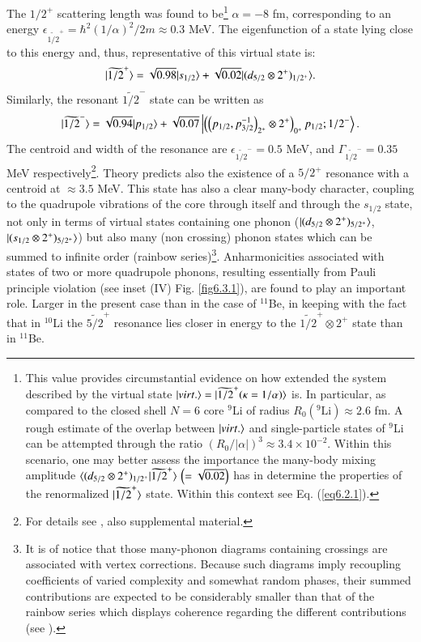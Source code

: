 The $1/2^+$ scattering length was found to be\footnote{This value provides circumstantial evidence on how extended the system described by the virtual state $|{virt.} \rangle=|{\widetilde{1/2}^+ (\kappa=1/\alpha)} \rangle$ is. In particular, as compared to the closed shell $N=6$ core $^9$Li of radius $R_0(^9\text{Li})\approx2.6$ fm. A rough estimate of the overlap between $|{virt.} \rangle$ and single-particle states of $^9$Li can be attempted through the ratio $(R_0/|\alpha|)^3\approx3.4\times10^{-2}$. Within this scenario, one may better assess the importance  the many-body mixing amplitude $\langle {(d_{5/2}\otimes 2^+)_{1/2^+}|\widetilde{1/2}^+} \rangle\,\left(=\sqrt{0.02}\right)$ has in determine the properties of the renormalized $|{\widetilde{1/2}^+} \rangle$ state. Within this context see Eq. (\ref{eq6.2.1}).} $\alpha=-8$ fm, corresponding to an energy $\epsilon_{\widetilde{1/2}^+}=\hbar^2(1/\alpha)^2/2m\approx0.3$ MeV. The eigenfunction of a state lying close to this energy and, thus, representative of this virtual state is:
\begin{equation}\label{eq5.2.1}
|{\widetilde{1/2}^+} \rangle=\sqrt{0.98}|{s_{1/2}} \rangle+\sqrt{0.02}|{(d_{5/2}\otimes2^+)_{1/2^+}} \rangle. 
\end{equation}
Similarly, the resonant $\widetilde{1/2}^-$  state can be  written as
\begin{equation}\label{eq5.2.2}
|{\widetilde{1/2}^-} \rangle=\sqrt{0.94}|{p_{1/2}} \rangle+\sqrt{0.07}\left|\left(\left(p_{1/2},p_{3/2}^{-1}\right)_{2^+}\otimes2^+\right)_{0^+}p_{1/2};1/2^-\right\rangle.
\end{equation}
The centroid and width of the resonance are $\epsilon_{\widetilde{1/2}^-}=0.5$ MeV, and $\Gamma_{\widetilde{1/2}^-}=0.35$ MeV respectively\footnote{For details see \cite{Barranco:20}, also supplemental material.}. Theory predicts also the existence of a $5/2^+$ resonance with a centroid at $\approx 3.5$ MeV. This state has also a clear many-body character, coupling to the quadrupole vibrations of the core through itself and through the $s_{1/2}$ state, not only in terms of virtual states containing one phonon ($|{(d_{5/2}\otimes2^+)_{5/2^+}} \rangle$, $|{(s_{1/2}\otimes2^+)_{5/2^+}} \rangle$)  but also many (non crossing) phonon states which can be summed to infinite order (rainbow series)\footnote{It is of notice that those many-phonon diagrams containing crossings are associated with vertex corrections. Because such diagrams imply recoupling coefficients of varied complexity and somewhat random phases, their summed contributions are expected to be considerably smaller than that of the rainbow series which displays coherence regarding the different contributions (see \cite{Barranco:19}).}. Anharmonicities associated with states of two or more quadrupole phonons, resulting essentially from Pauli principle violation (see inset (IV) Fig. \ref{fig6.3.1}), are found to play an important role. Larger in the present case than in the case of $^{11}$Be, in keeping with the fact that in $^{10}$Li the $\widetilde{5/2}^+$ resonance lies closer in energy to the $\widetilde{1/2}^+\otimes2^+$ state than in  $^{11}$Be. 


